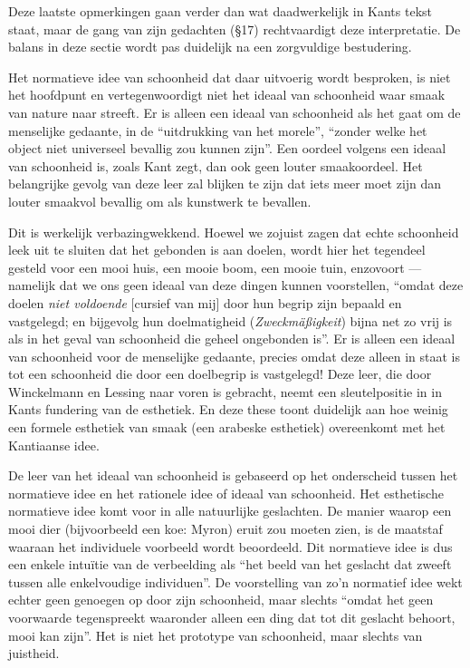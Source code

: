 Deze laatste opmerkingen gaan verder dan wat daadwerkelijk in Kants tekst staat, maar de gang van zijn gedachten (§17) rechtvaardigt deze interpretatie. De balans in deze sectie wordt pas duidelijk na een zorgvuldige bestudering.

Het normatieve idee van schoonheid dat daar uitvoerig wordt besproken, is niet het hoofdpunt en vertegenwoordigt niet het ideaal van schoonheid waar smaak van nature naar streeft. Er is alleen een ideaal van schoonheid als het gaat om de menselijke gedaante, in de ``uitdrukking van het morele'', ``zonder welke het object niet universeel bevallig zou kunnen zijn''. Een oordeel volgens een ideaal van schoonheid is, zoals Kant zegt, dan ook geen louter smaakoordeel. Het belangrijke gevolg van deze leer zal blijken te zijn dat iets meer moet zijn dan louter smaakvol bevallig om als kunstwerk te bevallen.

Dit is werkelijk verbazingwekkend. Hoewel we zojuist zagen dat echte schoonheid leek uit te sluiten dat het gebonden is aan doelen, wordt hier het tegendeel gesteld voor een mooi huis, een mooie boom, een mooie tuin, enzovoort — namelijk dat we ons geen ideaal van deze dingen kunnen voorstellen, ``omdat deze doelen \textit{niet voldoende} [cursief van mij] door hun begrip zijn bepaald en vastgelegd; en bijgevolg hun doelmatigheid (\textit{Zweckmäßigkeit}) bijna net zo vrij is als in het geval van schoonheid die geheel ongebonden is''. Er is alleen een ideaal van schoonheid voor de menselijke gedaante, precies omdat deze alleen in staat is tot een schoonheid die door een doelbegrip is vastgelegd! Deze leer, die door Winckelmann en Lessing naar voren is gebracht, neemt een sleutelpositie in in Kants fundering van de esthetiek. En deze these toont duidelijk aan hoe weinig een formele esthetiek van smaak (een arabeske esthetiek) overeenkomt met het Kantiaanse idee.

De leer van het ideaal van schoonheid is gebaseerd op het onderscheid tussen het normatieve idee en het rationele idee of ideaal van schoonheid. Het esthetische normatieve idee komt voor in alle natuurlijke geslachten. De manier waarop een mooi dier (bijvoorbeeld een koe: Myron) eruit zou moeten zien, is de maatstaf waaraan het individuele voorbeeld wordt beoordeeld. Dit normatieve idee is dus een enkele intuïtie van de verbeelding als ``het beeld van het geslacht dat zweeft tussen alle enkelvoudige individuen''. De voorstelling van zo'n normatief idee wekt echter geen genoegen op door zijn schoonheid, maar slechts ``omdat het geen voorwaarde tegenspreekt waaronder alleen een ding dat tot dit geslacht behoort, mooi kan zijn''. Het is niet het prototype van schoonheid, maar slechts van juistheid.

